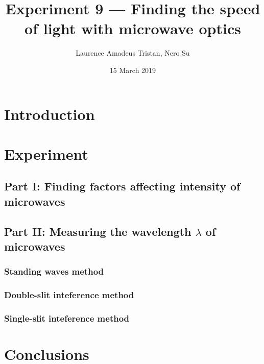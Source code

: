 \documentclass[letter,12pt]{article}
\title{Experiment 9 --- Finding the speed of light with microwave optics}
\author{Laurence Amadeus Tristan, Nero Su}
\date{15 March 2019}
\newcommand{\tlambda}{\(\lambda\) }
\numberwithin{equation}{section}
\numberwithin{figure}{section}
\numberwithin{table}{section}
\begin{document}
\maketitle

\section{Introduction}

\section{Experiment}
\subsection{Part I: Finding factors affecting intensity of microwaves}

\subsection{Part II: Measuring the wavelength \tlambda of microwaves}

\subsubsection{Standing waves method}

\subsubsection{Double-slit inteference method}

\subsubsection{Single-slit inteference method}

\section{Conclusions}
\end{document}
